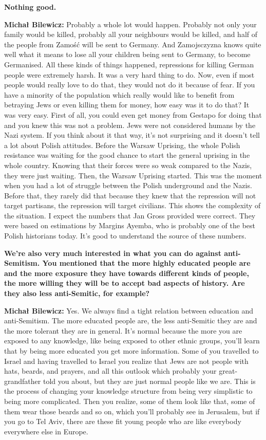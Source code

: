 \textbf{Nothing good.}

\textbf{Michał Bilewicz:} Probably a whole lot would happen. Probably not only your family would be killed, probably all your neighbours would be killed, and half of the people from Zamość will be sent to Germany. And Zamojsczyzna knows quite well what it means to lose all your children being sent to Germany, to become Germanised. All these kinds of things happened, repressions for killing German people were extremely harsh. It was a very hard thing to do. Now, even if most people would really love to do that, they would not do it because of fear. If you have a minority of the population which really would like to benefit from betraying Jews or even killing them for money, how easy was it to do that? It was very easy. First of all, you could even get money from Gestapo for doing that and you knew this was not a problem. Jews were not considered humans by the Nazi system. If you think about it that way, it’s not surprising and it doesn’t tell a lot about Polish attitudes. Before the Warsaw Uprising, the whole Polish resistance was waiting for the good chance to start the general uprising in the whole country. Knowing that their forces were so weak compared to the Nazis, they were just waiting. Then, the Warsaw Uprising started. This was the moment when you had a lot of struggle between the Polish underground and the Nazis. Before that, they rarely did that because they knew that the repression will not target partisans, the repression will target civilians. This shows the complexity of the situation. I expect the numbers that Jan Gross provided were correct. They were based on estimations by Margins Ayemba, who is probably one of the best Polish historians today. It’s good to understand the source of these numbers.  

\textbf{We’re also very much interested in what you can do against anti-Semitism. You mentioned that the more highly educated people are and the more exposure they have towards different kinds of people, the more willing they will be to accept bad aspects of history. Are they also less anti-Semitic, for example?} 

\textbf{Michał Bilewicz:} Yes. We always find a tight relation between education and anti-Semitism. The more educated people are, the less anti-Semitic they are and the more tolerant they are in general. It’s normal because the more you are exposed to any knowledge, like being exposed to other ethnic groups, you'll learn that by being more educated you get more information. Some of you travelled to Israel and having travelled to Israel you realize that Jews are not people with hats, beards, and prayers, and all this outlook which probably your great-grandfather told you about, but they are just normal people like we are. This is the process of changing your knowledge structure from being very simplistic to being more complicated. Then you realize, some of them look like that, some of them wear those beards and so on, which you'll probably see in Jerusalem, but if you go to Tel Aviv, there are these fit young people who are like everybody everywhere else in Europe. 

